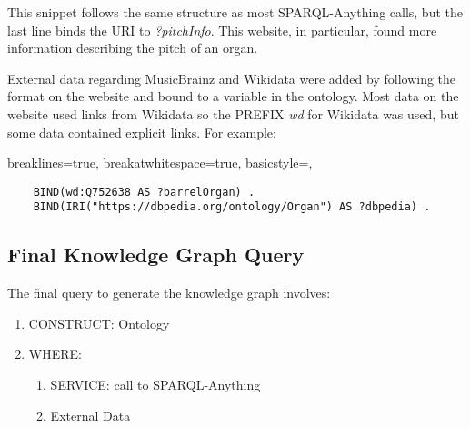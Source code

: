 This snippet follows the same structure as most SPARQL-Anything calls, but the last line binds the URI to \textit{?pitchInfo}. This website, in particular, found more information describing the pitch of an organ. 

External data regarding MusicBrainz and Wikidata were added by following the format on the website and bound to a variable in the ontology. Most data on the website used links from Wikidata so the PREFIX \textit{wd} for Wikidata was used, but some data contained explicit links. For example:

\lstset
{
    breaklines=true,
    breakatwhitespace=true,
    basicstyle=\ttfamily,
}
\begin{lstlisting}
    BIND(wd:Q752638 AS ?barrelOrgan) . 
    BIND(IRI("https://dbpedia.org/ontology/Organ") AS ?dbpedia) .
\end{lstlisting}

\subsection{Final Knowledge Graph Query}
\hspace*{0.5cm} The final query to generate the knowledge graph involves: 

\begin{enumerate}
    \item CONSTRUCT: Ontology
    \item WHERE:
    \begin{enumerate}
        \vspace{-0.25cm}
        \item SERVICE: call to SPARQL-Anything
        \item External Data
    \end{enumerate}
\end{enumerate}
